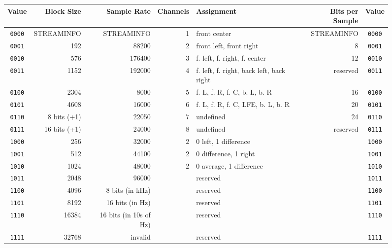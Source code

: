 \begin{figure}[h]
\begin{tiny}
\begin{tabular}{|c|r|r|r|l|r|c|}
\hline
Value & Block Size & Sample Rate & Channels & Assignment & Bits per Sample & Value \\
\hline
\texttt{0000} & STREAMINFO & STREAMINFO & 1 & front center & STREAMINFO & \texttt{0000} \\
\texttt{0001} & 192 & 88200 & 2 & front left, front right & 8 & \texttt{0001} \\
\texttt{0010} & 576 & 176400 & 3 & f. left, f. right, f. center & 12 & \texttt{0010} \\
\texttt{0011} & 1152 & 192000 & 4 & f. left, f. right, back left, back right & reserved & \texttt{0011} \\
\texttt{0100} & 2304 & 8000 & 5 & f. L, f. R, f. C, b. L, b. R & 16 & \texttt{0100} \\
\texttt{0101} & 4608 & 16000 & 6 & f. L, f. R, f. C, LFE, b. L, b. R & 20 & \texttt{0101} \\
\texttt{0110} & 8 bits (+1) & 22050 & 7 & undefined & 24 & \texttt{0110} \\
\texttt{0111} & 16 bits (+1) & 24000 & 8 & undefined & reserved & \texttt{0111} \\
\texttt{1000} & 256 & 32000 & 2 & 0 left, 1 difference & & \texttt{1000} \\
\texttt{1001} & 512 & 44100 & 2 & 0 difference, 1 right & & \texttt{1001} \\
\texttt{1010} & 1024 & 48000 & 2 & 0 average, 1 difference & & \texttt{1010} \\
\texttt{1011} & 2048 & 96000 & & reserved & & \texttt{1011} \\
\texttt{1100} & 4096 & 8 bits (in kHz) & & reserved & & \texttt{1100} \\
\texttt{1101} & 8192 & 16 bits (in Hz) & & reserved & & \texttt{1101} \\
\texttt{1110} & 16384 & 16 bits (in 10s of Hz) & & reserved & & \texttt{1110} \\
\texttt{1111} & 32768 & invalid & & reserved & & \texttt{1111} \\
\hline
\end{tabular}
\end{tiny}
\end{figure}
\par
